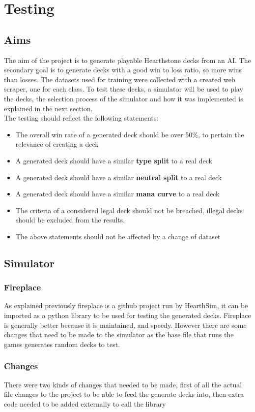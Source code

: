 \documentclass{report} %
\begin{document}
\chapter{Testing}
\section{Aims}
The aim of the project is to generate playable Hearthstone decks from an AI. The secondary goal is to generate decks with a good win to loss ratio, so more wins than losses. The datasets used for training were collected with a created web scraper, one for each class. To test these decks, a simulator will be used to play the decks, the selection process of the simulator and how it was implemented is explained in the next section.\\
The testing should reflect the following statements: 
\begin{itemize}
\item The overall win rate of a generated deck should be over 50\%, to pertain the relevance of creating a deck
\item A generated deck should have a similar \textbf{type split} to a real deck
\item A generated deck should have a similar \textbf{neutral split} to a real deck
\item A generated deck should have a similar \textbf{mana curve} to a real deck
\item The criteria of a considered legal deck should not be breached, illegal decks should be excluded from the results.
\item The above statements should not be affected by a change of dataset
\end{itemize}
\section{Simulator}
\subsection{Fireplace}
As explained previously fireplace is a github project run by HearthSim, it can be imported as a python library to be used for testing the generated decks. Fireplace is generally better because it is maintained, and speedy. However there are some changes that need to be made to the simulator as the base file that runs the games generates random decks to test.
\subsection{Changes}
There were two kinds of changes that needed to be made, first of all the actual file changes to the project to be able to feed the generate decks into, then extra code needed to be added externally to call the library
\end{document}
